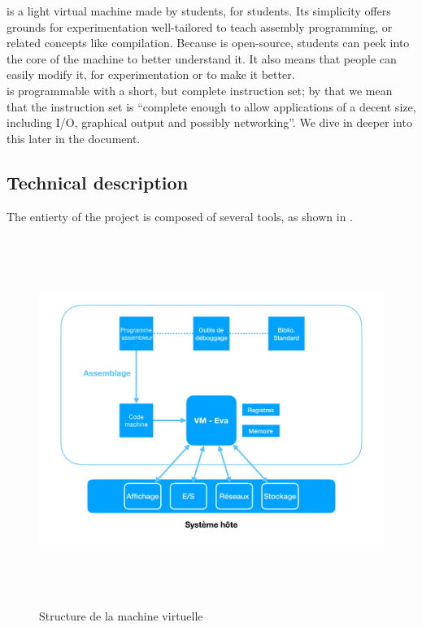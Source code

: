 \documentclass[11pt,twoside]{article}
\begin{document}
 is a light virtual machine made by students, for students. Its simplicity offers grounds for experimentation well-tailored to teach assembly programming, or related concepts like compilation. Because  is open-source, students can peek into the core of the machine to better understand it. It also means that people can easily modify it, for experimentation or to make it better.\\
 is programmable with a short, but complete instruction set; by that we mean that the instruction set is ``complete enough to allow applications of a decent size, including I/O, graphical output and possibly networking''. We dive in deeper into this later in the document.

\subsection{Technical description}

The entierty of the  project is composed of several tools, as shown in .
\begin{figure}[tb]
  \centering
  \includegraphics[width=12cm, height=12cm, keepaspectratio]{diagram1_graph.pdf}
  \caption{Structure de la machine virtuelle }
  \label{fig:diagram1}
\end{figure}
\end{document}
